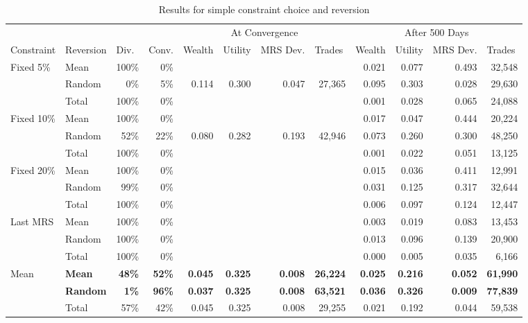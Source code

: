 \documentclass[12pt,a4paper,titlepage]{article}
\begin{document}
\begin{table}
  \begin{tabular}{ll|rr|rrrr|rrrr}
    &  & \multicolumn{1}{|l}{} & \multicolumn{1}{l|}{} & \multicolumn{ 4}{c|}{At Convergence} & \multicolumn{ 4}{c}{After 500 Days} \\
    Constraint & Reversion & \multicolumn{1}{l}{Div.} & \multicolumn{1}{l|}{Conv.} & \multicolumn{1}{l}{Wealth} & \multicolumn{1}{l}{Utility} & \multicolumn{1}{l}{MRS Dev.} & \multicolumn{1}{l|}{Trades} & \multicolumn{1}{l}{Wealth} & \multicolumn{1}{l}{Utility} & \multicolumn{1}{l}{MRS Dev.} & \multicolumn{1}{l}{Trades} \\ 
    \hline
    \multicolumn{ 1}{l}{Fixed 5\%} & Mean & 100\% & 0\% &  &  &  &  & 0.021 & 0.077 & 0.493 & 32,548 \\
    \multicolumn{ 1}{l}{} & Random & 0\% & 5\% & 0.114 & 0.300 & 0.047 & 27,365 & 0.095 & 0.303 & 0.028 & 29,630 \\
    \multicolumn{ 1}{l}{} & Total & 100\% & 0\% &  &  &  &  & 0.001 & 0.028 & 0.065 & 24,088 \\
    \multicolumn{ 1}{l}{Fixed 10\%} & Mean & 100\% & 0\% &  &  &  &  & 0.017 & 0.047 & 0.444 & 20,224 \\
    \multicolumn{ 1}{l}{} & Random & 52\% & 22\% & 0.080 & 0.282 & 0.193 & 42,946 & 0.073 & 0.260 & 0.300 & 48,250 \\
    \multicolumn{ 1}{l}{} & Total & 100\% & 0\% &  &  &  &  & 0.001 & 0.022 & 0.051 & 13,125 \\
    \multicolumn{ 1}{l}{Fixed 20\%} & Mean & 100\% & 0\% &  &  &  &  & 0.015 & 0.036 & 0.411 & 12,991 \\
    \multicolumn{ 1}{l}{} & Random & 99\% & 0\% &  &  &  &  & 0.031 & 0.125 & 0.317 & 32,644 \\
    \multicolumn{ 1}{l}{} & Total & 100\% & 0\% &  &  &  &  & 0.006 & 0.097 & 0.124 & 12,447 \\
    \multicolumn{ 1}{l}{Last MRS} & Mean & 100\% & 0\% &  &  & &  & 0.003 & 0.019 & 0.083 & 13,453 \\
    \multicolumn{ 1}{l}{} & Random & 100\% & 0\% &  &  &  &  & 0.013 & 0.096 & 0.139 & 20,900 \\
    \multicolumn{ 1}{l}{} & Total & 100\% & 0\% &  &  &  &  & 0.000 & 0.005 & 0.035 & 6,166 \\
    \multicolumn{ 1}{l}{Mean} & \textbf{Mean} & \textbf{48\%} & \textbf{52\%} & \textbf{0.045} & \textbf{0.325} & \textbf{0.008} & \textbf{26,224} & \textbf{0.025} & \textbf{0.216} & \textbf{0.052} & \textbf{61,990} \\
    \multicolumn{ 1}{l}{} & \textbf{Random} & \textbf{1\%} & \textbf{96\%} & \textbf{0.037} & \textbf{0.325} & \textbf{0.008} & \textbf{63,521} & \textbf{0.036} & \textbf{0.326} & \textbf{0.009} & \textbf{77,839} \\
    \multicolumn{ 1}{l}{} & Total & 57\% & 42\% & 0.045 & 0.325 & 0.008 & 29,255 & 0.021 & 0.192 & 0.044 & 59,538 \\
  \end{tabular}
\caption{Results for simple constraint choice and reversion}
\label{tab:simple}
\end{table}
\end{document}
